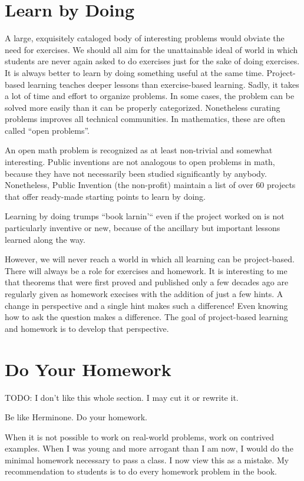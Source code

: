 \documentclass[
	fontsize=10pt, %
	twoside=false, %
	secnumdepth=1, %
]{kaobook}
\begin{document}
\section{Learn by Doing}

A large, exquisitely cataloged body of interesting problems would obviate
the need for exercises.
We should all aim for the unattainable ideal of world in which students are never again
asked to do exercises just for the sake of doing exercises.
It is always better to learn by doing something useful at the same time.
Project-based learning teaches deeper lessons than exercise-based learning.
Sadly, it takes a lot of time and effort to organize problems.
In some cases, the problem can be solved more easily than it can be properly categorized.
Nonetheless curating problems improves all technical communities.
In mathematics, these are often called ``open problems''.

An open math problem
is recognized as at least non-trivial and somewhat interesting.
Public inventions are not analogous to open problems in math, because they
have not necessarily been studied significantly by anybody.
Nonetheless, Public Invention (the non-profit)  maintain a list of over 60 projects that offer ready-made
starting points to learn by doing.

Learning by doing trumps ``book larnin'`` even if the project worked on
is not particularly inventive or new, because of the ancillary but important
lessons learned along the way.

However, we will never reach a world in which all learning can be project-based.
There will always be a role for exercises and homework.
It is interesting to me that theorems that were first proved and published only a few decades
ago are regularly given as homework execises with the addition of just a few hints.
A change in perspective and a single hint makes such a  difference!
Even knowing how to ask the question makes a difference.
The goal of project-based learning and homework is to develop that perspective.

\section{Do Your Homework}

TODO: I don't like this whole section. I may cut it or rewrite it.

Be like Herminone. Do your homework.

When it is not possible to work on real-world problems, work on contrived examples.
When I was young and more arrogant than I am now, I would do the minimal homework
necessary to pass a class.
I now view this as a mistake.
My recommendation to students is to do every homework problem in the book.
\end{document}
